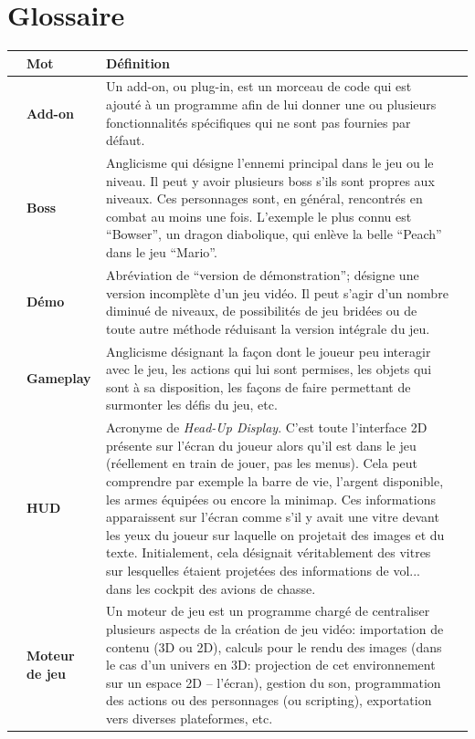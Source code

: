 \startcontents[chapters]
\chapter{Glossaire}

\newpage

\label{chap:vocabulaire}
\begin{center}
	\begin{longtabu} to 
		& \textnormal{\selectfont Mot} & Définition & \\
		\endhead
		\endfoot
		& Add-on & Un add-on, ou plug-in, est un morceau de code qui est ajouté à un programme afin de lui donner une ou plusieurs fonctionnalités spécifiques qui ne sont pas fournies par défaut. & \\
		& Boss & Anglicisme qui désigne l'ennemi principal dans le jeu ou le niveau. Il peut y avoir plusieurs boss s'ils sont propres aux niveaux. Ces personnages sont, en général, rencontrés en combat au moins une fois. L'exemple le plus connu est \enquote{Bowser}, un dragon diabolique, qui enlève la belle \enquote{Peach} dans le jeu \enquote{Mario}. & \\
		& Démo & Abréviation de \enquote{version de démonstration}; désigne une version incomplète d'un jeu vidéo. Il peut s'agir d'un nombre diminué de niveaux, de possibilités de jeu bridées ou de toute autre méthode réduisant la version intégrale du jeu. & \\
		& Gameplay & Anglicisme désignant la façon dont le joueur peu interagir avec le jeu, les actions qui lui sont permises, les objets qui sont à sa disposition, les façons de faire permettant de surmonter les défis du jeu, etc. & \\
		& HUD & Acronyme de \textit{Head-Up Display}. C'est toute l'interface 2D présente sur l'écran du joueur alors qu'il est dans le jeu (réellement en train de jouer, pas les menus). Cela peut comprendre par exemple la barre de vie, l'argent disponible, les armes équipées ou encore la minimap. Ces informations apparaissent sur l'écran comme s'il y avait une vitre devant les yeux du joueur sur laquelle on projetait des images et du texte. Initialement, cela désignait véritablement des vitres sur lesquelles étaient projetées des informations de vol... dans les cockpit des avions de chasse. & \\
		& Moteur de jeu & Un moteur de jeu est un programme chargé de centraliser plusieurs aspects de la création de jeu vidéo: importation de contenu (3D ou 2D), calculs pour le rendu des images (dans le cas d'un univers en 3D: projection de cet environnement sur un espace 2D -- l'écran), gestion du son, programmation des actions ou des personnages (ou scripting), exportation vers diverses plateformes, etc. & \\

\end{longtabu}
\end{center}
